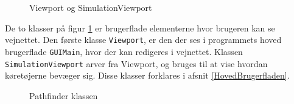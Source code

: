 \begin{figure}[H]
    \centering
    \caption{Viewport og SimulationViewport}
    \label{kdViewport}
\end{figure}

De to klasser på figur \ref{kdViewport} er brugerflade elementerne hvor brugeren kan se vejnettet. Den første klasse \texttt{Viewport}, er den der ses i programmets hoved brugerflade \texttt{GUIMain}, hvor der kan redigeres i vejnettet. Klassen \texttt{SimulationViewport} arver fra Viewport, og bruges til at vise hvordan køretøjerne bevæger sig. Disse klasser forklares i afsnit \ref{HovedBrugerfladen}.

\begin{figure}[H]
    \centering
    \caption{Pathfinder klassen}
    \label{kdPathfinder}
\end{figure}


